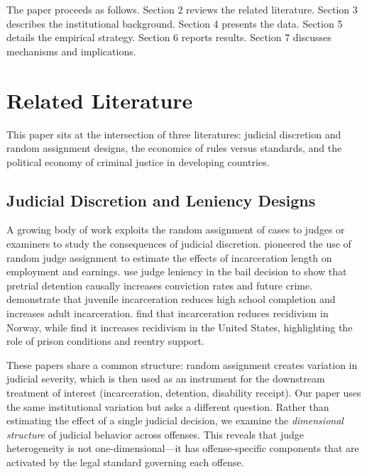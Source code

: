 \documentclass[12pt]{article}
\begin{document}
The paper proceeds as follows. Section 2 reviews the related literature. Section 3 describes the institutional background. Section 4 presents the data. Section 5 details the empirical strategy. Section 6 reports results. Section 7 discusses mechanisms and implications.


\section{Related Literature}

This paper sits at the intersection of three literatures: judicial discretion and random assignment designs, the economics of rules versus standards, and the political economy of criminal justice in developing countries.

\subsection{Judicial Discretion and Leniency Designs}

A growing body of work exploits the random assignment of cases to judges or examiners to study the consequences of judicial discretion. \citet{kling2006} pioneered the use of random judge assignment to estimate the effects of incarceration length on employment and earnings. \citet{dobbie2018} use judge leniency in the bail decision to show that pretrial detention causally increases conviction rates and future crime. \citet{aizer2015} demonstrate that juvenile incarceration reduces high school completion and increases adult incarceration. \citet{bhuller2020} find that incarceration reduces recidivism in Norway, while \citet{norris2021} find it increases recidivism in the United States, highlighting the role of prison conditions and reentry support.

These papers share a common structure: random assignment creates variation in judicial severity, which is then used as an instrument for the downstream treatment of interest (incarceration, detention, disability receipt). Our paper uses the same institutional variation but asks a different question. Rather than estimating the effect of a single judicial decision, we examine the \textit{dimensional structure} of judicial behavior across offenses. This reveals that judge heterogeneity is not one-dimensional---it has offense-specific components that are activated by the legal standard governing each offense.
\end{document}
